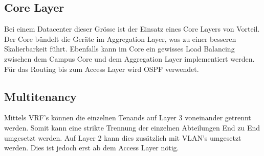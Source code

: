 \subsection{Core Layer}
Bei einem Datacenter dieser Grösse ist der Einsatz eines Core Layers von Vorteil. Der Core bündelt die Geräte im Aggregation Layer, was zu einer besseren Skalierbarkeit führt. Ebenfalls kann im Core ein gewisses Load Balancing zwischen dem Campus Core und dem Aggregation Layer implementiert werden. Für das Routing bis zum Access Layer wird OSPF verwendet.  


\subsection{Multitenancy}
Mittels VRF's können die einzelnen Tenands auf Layer 3 voneinander getrennt werden. Somit kann eine strikte Trennung der einzelnen Abteilungen End zu End umgesetzt werden. Auf Layer 2 kann dies zusätzlich mit VLAN's umgesetzt werden. Dies ist jedoch erst ab dem Access Layer nötig. 



